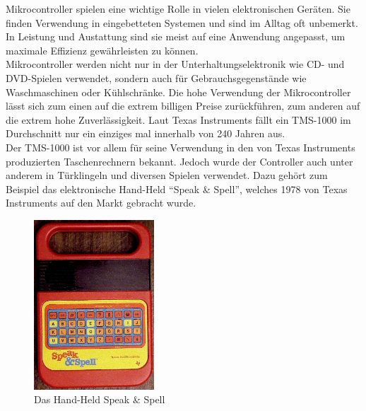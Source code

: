 Mikrocontroller spielen eine wichtige Rolle in vielen elektronischen Ger{\"a}ten. Sie finden Verwendung in eingebetteten Systemen und sind im Alltag oft unbemerkt. In Leistung und Austattung sind sie meist auf eine Anwendung angepasst, um maximale Effizienz gew{\"a}hrleisten zu k{\"o}nnen.  \\
Mikrocontroller werden nicht nur in der Unterhaltungselektronik wie CD- und DVD-Spielen verwendet, sondern auch f{\"u}r Gebrauchsgegenst{\"a}nde wie Waschmaschinen oder K{\"u}hlschr{\"a}nke. Die hohe Verwendung der Mikrocontroller l{\"a}sst sich zum einen auf die extrem billigen Preise zur{\"u}ckf{\"u}hren, zum anderen auf die extrem hohe Zuverl{\"a}ssigkeit. Laut Texas Instruments f{\"a}llt ein TMS-1000 im Durchschnitt nur ein einziges mal innerhalb von 240 Jahren aus. \\
Der TMS-1000 ist vor allem f{\"u}r seine Verwendung in den von Texas Instruments produzierten Taschenrechnern bekannt. Jedoch wurde der Controller auch unter anderem in T{\"u}rklingeln und diversen Spielen verwendet. Dazu geh{\"o}rt zum Beispiel das elektronische Hand-Held "`Speak \& Spell"', welches 1978 von Texas Instruments auf den Markt gebracht wurde. 

\begin{figure}[!htb]
	\centering
		\includegraphics[width=0.4\textwidth]{figures/sp_sp.JPG}
	\caption{Das Hand-Held Speak \& Spell}
	\label{fig:sp_sp}
\end{figure}